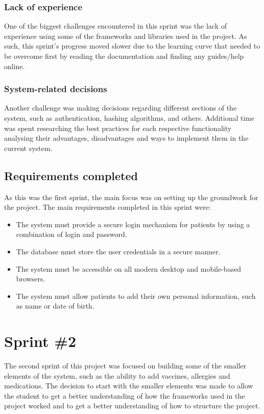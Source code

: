 \subsubsection{Lack of experience}

One of the biggest challenges encountered in this sprint was the lack of experience using some of the frameworks and libraries used in the project. As such, this sprint's progress moved slower due to the learning curve that needed to be overcome first by reading the documentation and finding any guides/help online.

\subsubsection{System-related decisions}

Another challenge was making decisions regarding different sections of the system, such as authentication, hashing algorithms, and others. Additional time was spent researching the best practices for each respective functionality \- analysing their advantages, disadvantages and ways to implement them in the current system.

\subsection{Requirements completed}

As this was the first sprint, the main focus was on setting up the groundwork for the project. The main requirements completed in this sprint were:

\begin{itemize}
    \item The system must provide a secure login mechanism for patients by using a combination of login and password.
    \item The database must store the user credentials in a secure manner.
    \item The system must be accessible on all modern desktop and mobile-based browsers.
    \item The system must allow patients to add their own personal information, such as name or date of birth.
\end{itemize}

\section{Sprint \#2}

The second sprint of this project was focused on building some of the smaller elements of the system, such as the ability to add vaccines, allergies and medications. The decision to start with the smaller elements was made to allow the student to get a better understanding of how the frameworks used in the project worked and to get a better understanding of how to structure the project.

